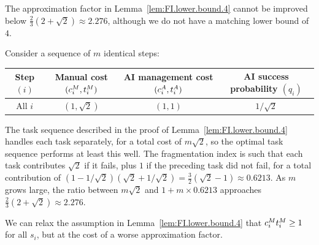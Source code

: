 The approximation factor in Lemma~\ref{lem:FI.lower.bound.4} cannot be improved below $\tfrac{2}{3}(2+\sqrt{2}) \approx 2.276$, although we do not have a matching lower bound of $4$.

\begin{example}
\label{ex:FI.lower.gap}
Consider a sequence of $m$ identical steps:
\begin{center}
\begin{tabular}{c|ccc}
\toprule
\makecell{Step\\$(i)$} & \makecell{Manual cost\\$(c^{M}_{i}, t^{M}_{i})$} & \makecell{AI management cost\\$(c^{A}_{i}, t^{A}_{i})$} & \makecell{AI success probability\\$(q_i)$} \\
\midrule
All $i$ & $(1, \sqrt{2})$ & $(1, 1)$ & $1/\sqrt{2}$ \\
\bottomrule
\end{tabular}
\end{center}
The task sequence described in the proof of Lemma~\ref{lem:FI.lower.bound.4} handles each task separately, for a total cost of $m \sqrt{2}$, so the optimal task sequence performs at least this well.
The fragmentation index is such that each task contributes $\sqrt{2}$ if it fails, plus $1$ if the preceding task did not fail, for a total contribution of $(1-1/\sqrt{2})(\sqrt{2} + 1/\sqrt{2}) = \tfrac{3}{2}(\sqrt{2}-1) \approx 0.6213$.
As $m$ grows large, the ratio between $m\sqrt{2}$ and $1 + m \times 0.6213$ approaches $\tfrac{2}{3}(2+\sqrt{2}) \approx 2.276$.
\end{example}

We can relax the assumption in Lemma~\ref{lem:FI.lower.bound.4} that $c^{M}_{i}t^{M}_{i} \geq 1$ for all $s_i$, but at the cost of a worse approximation factor.

